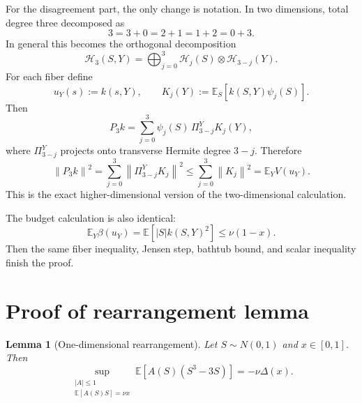 \documentclass[11pt]{article}
\newtheorem{lemma}[theorem]{Lemma}
\newcommand{\E}{\mathbb E}
\newcommand{\norm}[1]{\left\|#1\right\|}
\newcommand{\cH}{\mathcal H}
\begin{document}
For the disagreement part, the only change is notation.  In two dimensions, total degree three decomposed as
\[
        3=3+0=2+1=1+2=0+3.
\]
In general this becomes the orthogonal decomposition
\[
        \cH_3(S,Y)
        =\bigoplus_{j=0}^3 \cH_j(S)\otimes \cH_{3-j}(Y).
\]
For each fiber define
\[
        u_Y(s):=k(s,Y),
        \qquad
        K_j(Y):=\E_S[k(S,Y)\psi_j(S)].
\]
Then
\[
        P_3k
        =\sum_{j=0}^3 \psi_j(S)\,\Pi_{3-j}^Y K_j(Y),
\]
where $\Pi_{3-j}^Y$ projects onto transverse Hermite degree $3-j$.  Therefore
\[
        \norm{P_3k}^2
        =\sum_{j=0}^3\norm{\Pi_{3-j}^Y K_j}^2
        \le \sum_{j=0}^3\norm{K_j}^2
        =\E_Y V(u_Y).
\]
This is the exact higher-dimensional version of the two-dimensional calculation.

The budget calculation is also identical:
\[
        \E_Y\beta(u_Y)=\E[|S|k(S,Y)^2]\le \nu(1-x).
\]
Then the same fiber inequality, Jensen step, bathtub bound, and scalar inequality finish the proof.

\appendix 

\section{Proof of rearrangement lemma}
\label{app:rearrangement_lemma}


\begin{lemma}[One-dimensional rearrangement]
Let $S\sim N(0,1)$ and $x\in[0,1]$.  Then
\[
        \sup_{\substack{|A|\le1\\ \E[A(S)S]=\nu x}}
        \E[A(S)(S^3-3S)]
        =-\nu\Delta(x).
\]
\end{lemma}
\end{document}
